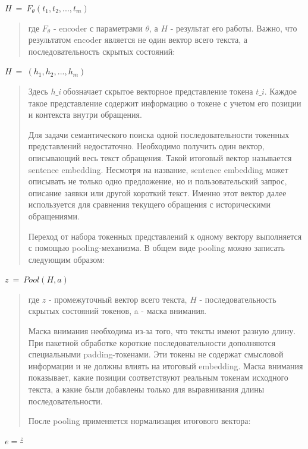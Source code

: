 \(H\  = \ F_{\theta}(t_{1},t_{2},...,t_{m})\)

\begin{quote}
где \(F_{\theta}\) - encoder с параметрами \(\theta\), а \(H\) -
результат его работы. Важно, что результатом encoder является не один
вектор всего текста, а последовательность скрытых состояний:
\end{quote}

\(H\  = \ (h_{1},h_{2},...,h_{m})\)

\begin{quote}
Здесь \(h\_ i\ \)обозначает скрытое векторное представление токена
\(t\_ i\). Каждое такое представление содержит информацию о токене с
учетом его позиции и контекста внутри обращения.

Для задачи семантического поиска одной последовательности токенных
представлений недостаточно. Необходимо получить один вектор, описывающий
весь текст обращения. Такой итоговый вектор называется sentence
embedding. Несмотря на название, sentence embedding может описывать не
только одно предложение, но и пользовательский запрос, описание заявки
или другой короткий текст. Именно этот вектор далее используется для
сравнения текущего обращения с историческими обращениями.

Переход от набора токенных представлений к одному вектору выполняется с
помощью pooling-механизма. В общем виде pooling можно записать следующим
образом:
\end{quote}

\(z\  = \ Pool(H,a)\)

\begin{quote}
где \(z\) - промежуточный вектор всего текста, \(H\) -
последовательность скрытых состояний токенов, a - маска внимания.

Маска внимания необходима из-за того, что тексты имеют разную длину. При
пакетной обработке короткие последовательности дополняются специальными
padding-токенами. Эти токены не содержат смысловой информации и не
должны влиять на итоговый embedding. Маска внимания показывает, какие
позиции соответствуют реальным токенам исходного текста, а какие были
добавлены только для выравнивания длины последовательности.

После pooling применяется нормализация итогового вектора:
\end{quote}

\(e = \frac{z}{}\)

